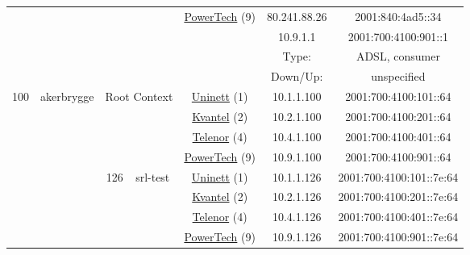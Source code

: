 \begin{small}
\begin{center}
\begin{longtable}{|c|c|c|c|c|c|c|c|}
  & \multicolumn{3}{|c|}{} & \multicolumn{2}{|c|}{\multirow{4}{*}{\tiny{\href{http://www.powertech.no}{PowerTech} (9)}}} & \tiny{80.241.88.26} & \tiny{2001:840:4ad5::34} \\* \cline{7-7}\cline{8-8}
  & \multicolumn{3}{|c|}{} & \multicolumn{2}{|c|}{} & \tiny{10.9.1.1} & \tiny{2001:700:4100:901::1} \\* \cline{7-7}\cline{8-8}
  & \multicolumn{3}{|c|}{} & \multicolumn{2}{|c|}{} & Type: & ADSL, consumer \\* \cline{7-7}\cline{8-8}
  & \multicolumn{3}{|c|}{} & \multicolumn{2}{|c|}{} & Down/Up:  & unspecified \\ \hline
 \multirow{24}{*}{\tiny{100}} & \multicolumn{1}{|l|}{\multirow{24}{*}{\tiny{akerbrygge}}} & \multicolumn{2}{|c|}{\multirow{4}{*}{\tiny{Root Context}}} & \multicolumn{2}{|c|}{\tiny{\href{https://www.uninett.no}{Uninett} (1)}} & \tiny{10.1.1.100} & \tiny{2001:700:4100:101::64} \\* \cline{5-5}\cline{6-6}\cline{7-7}\cline{8-8}
  &  & \multicolumn{2}{|c|}{} & \multicolumn{2}{|c|}{\tiny{\href{http://kvantel.no}{Kvantel} (2)}} & \tiny{10.2.1.100} & \tiny{2001:700:4100:201::64} \\* \cline{5-5}\cline{6-6}\cline{7-7}\cline{8-8}
  &  & \multicolumn{2}{|c|}{} & \multicolumn{2}{|c|}{\tiny{\href{https://www.telenor.no}{Telenor} (4)}} & \tiny{10.4.1.100} & \tiny{2001:700:4100:401::64} \\* \cline{5-5}\cline{6-6}\cline{7-7}\cline{8-8}
  &  & \multicolumn{2}{|c|}{} & \multicolumn{2}{|c|}{\tiny{\href{http://www.powertech.no}{PowerTech} (9)}} & \tiny{10.9.1.100} & \tiny{2001:700:4100:901::64} \\* \cline{3-3}\cline{4-4}\cline{5-5}\cline{6-6}\cline{7-7}\cline{8-8}
  &  & \multirow{4}{*}{\tiny{126}} & \multicolumn{1}{|l|}{\multirow{4}{*}{\tiny{srl-test}}} & \multicolumn{2}{|c|}{\tiny{\href{https://www.uninett.no}{Uninett} (1)}} & \tiny{10.1.1.126} & \tiny{2001:700:4100:101::7e:64} \\* \cline{5-5}\cline{6-6}\cline{7-7}\cline{8-8}
  &  &  &  & \multicolumn{2}{|c|}{\tiny{\href{http://kvantel.no}{Kvantel} (2)}} & \tiny{10.2.1.126} & \tiny{2001:700:4100:201::7e:64} \\* \cline{5-5}\cline{6-6}\cline{7-7}\cline{8-8}
  &  &  &  & \multicolumn{2}{|c|}{\tiny{\href{https://www.telenor.no}{Telenor} (4)}} & \tiny{10.4.1.126} & \tiny{2001:700:4100:401::7e:64} \\* \cline{5-5}\cline{6-6}\cline{7-7}\cline{8-8}
  &  &  &  & \multicolumn{2}{|c|}{\tiny{\href{http://www.powertech.no}{PowerTech} (9)}} & \tiny{10.9.1.126} & \tiny{2001:700:4100:901::7e:64} \\* \cline{3-3}\cline{4-4}\cline{5-5}\cline{6-6}\cline{7-7}\cline{8-8}

\end{longtable}
\end{center}
\end{small}
